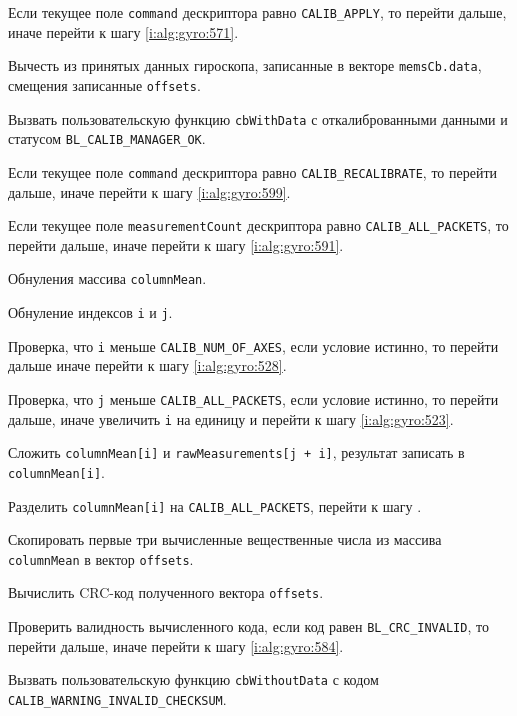 \begin{enumerate_step}
    \item \label{i:alg:gyro:566} Если текущее поле \lstinline|command| дескриптора равно \lstinline|CALIB_APPLY|, то перейти дальше, иначе перейти к шагу
    \ref{i:alg:gyro:571}.
    \item Вычесть из принятых данных гироскопа, записанные в векторе \lstinline|memsCb.data|, смещения записанные \lstinline|offsets|.
    \item Вызвать пользовательскую функцию \lstinline|cbWithData| с откалиброванными данными и статусом \lstinline|BL_CALIB_MANAGER_OK|.

    \item \label{i:alg:gyro:571} Если текущее поле \lstinline|command| дескриптора равно \lstinline|CALIB_RECALIBRATE|, то перейти дальше, иначе перейти к шагу
    \ref{i:alg:gyro:599}.
    \item \label{i:alg:gyro:573} Если текущее поле \lstinline|measurementCount| дескриптора равно \lstinline|CALIB_ALL_PACKETS|, то перейти дальше, иначе перейти к шагу
    \ref{i:alg:gyro:591}.
    \item Обнуления массива \lstinline|columnMean|.
    \item Обнуление индексов \lstinline|i| и \lstinline|j|.
    \item \label{i:alg:gyro:517} Проверка, что \lstinline|i| меньше \lstinline|CALIB_NUM_OF_AXES|, если условие истинно, то перейти дальше иначе перейти к шагу \ref{i:alg:gyro:528}.
    \item Проверка, что \lstinline|j| меньше \lstinline|CALIB_ALL_PACKETS|, если условие истинно, то перейти дальше, иначе увеличить \lstinline|i| на единицу и перейти к шагу \ref{i:alg:gyro:523}.
    \item Сложить \lstinline|columnMean[i]| и \lstinline|rawMeasurements[j + i]|, результат записать в \lstinline|columnMean[i]|.
    \item \label{i:alg:gyro:523} Разделить \lstinline|columnMean[i]| на \lstinline|CALIB_ALL_PACKETS|, перейти к шагу \label{i:alg:gyro:517}.
    \item \label{i:alg:gyro:528} Скопировать первые три вычисленные вещественные числа из массива \lstinline|columnMean| в вектор \lstinline|offsets|.
    \item Вычислить CRC-код полученного вектора \lstinline|offsets|.
    \item Проверить валидность вычисленного кода, если код равен \lstinline|BL_CRC_INVALID|, то перейти дальше, иначе перейти к шагу \ref{i:alg:gyro:584}.
    \item Вызвать пользовательскую функцию \lstinline|cbWithoutData| с кодом \lstinline|CALIB_WARNING_INVALID_CHECKSUM|.

\end{enumerate_step}
